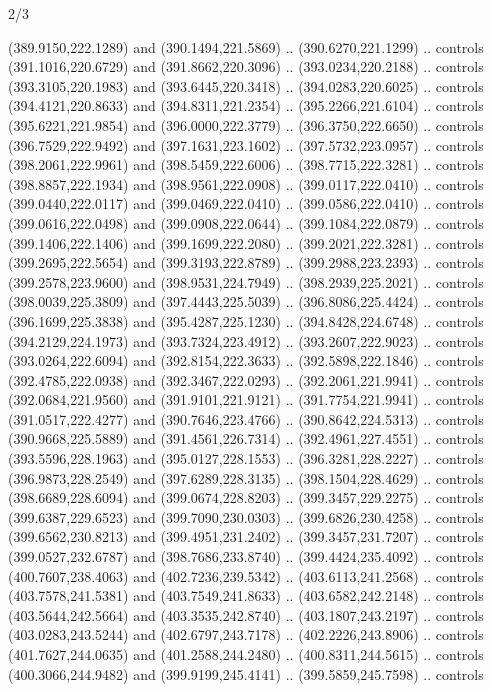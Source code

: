 \begin{flagdescription}{2/3}
\begin{scope}[xshift=0.5\flaglength,yshift=0.5\flagwidth,scale=\flagwidth/495.65]
\begin{scope}[y=0.8pt, x=0.8pt, yscale=-1,shift={(-463.76,-309.78)}]
  (389.9150,222.1289) and (390.1494,221.5869) .. (390.6270,221.1299) .. controls
  (391.1016,220.6729) and (391.8662,220.3096) .. (393.0234,220.2188) .. controls
  (393.3105,220.1983) and (393.6445,220.3418) .. (394.0283,220.6025) .. controls
  (394.4121,220.8633) and (394.8311,221.2354) .. (395.2266,221.6104) .. controls
  (395.6221,221.9854) and (396.0000,222.3779) .. (396.3750,222.6650) .. controls
  (396.7529,222.9492) and (397.1631,223.1602) .. (397.5732,223.0957) .. controls
  (398.2061,222.9961) and (398.5459,222.6006) .. (398.7715,222.3281) .. controls
  (398.8857,222.1934) and (398.9561,222.0908) .. (399.0117,222.0410) .. controls
  (399.0440,222.0117) and (399.0469,222.0410) .. (399.0586,222.0410) .. controls
  (399.0616,222.0498) and (399.0908,222.0644) .. (399.1084,222.0879) .. controls
  (399.1406,222.1406) and (399.1699,222.2080) .. (399.2021,222.3281) .. controls
  (399.2695,222.5654) and (399.3193,222.8789) .. (399.2988,223.2393) .. controls
  (399.2578,223.9600) and (398.9531,224.7949) .. (398.2939,225.2021) .. controls
  (398.0039,225.3809) and (397.4443,225.5039) .. (396.8086,225.4424) .. controls
  (396.1699,225.3838) and (395.4287,225.1230) .. (394.8428,224.6748) .. controls
  (394.2129,224.1973) and (393.7324,223.4912) .. (393.2607,222.9023) .. controls
  (393.0264,222.6094) and (392.8154,222.3633) .. (392.5898,222.1846) .. controls
  (392.4785,222.0938) and (392.3467,222.0293) .. (392.2061,221.9941) .. controls
  (392.0684,221.9560) and (391.9101,221.9121) .. (391.7754,221.9941) .. controls
  (391.0517,222.4277) and (390.7646,223.4766) .. (390.8642,224.5313) .. controls
  (390.9668,225.5889) and (391.4561,226.7314) .. (392.4961,227.4551) .. controls
  (393.5596,228.1963) and (395.0127,228.1553) .. (396.3281,228.2227) .. controls
  (396.9873,228.2549) and (397.6289,228.3135) .. (398.1504,228.4629) .. controls
  (398.6689,228.6094) and (399.0674,228.8203) .. (399.3457,229.2275) .. controls
  (399.6387,229.6523) and (399.7090,230.0303) .. (399.6826,230.4258) .. controls
  (399.6562,230.8213) and (399.4951,231.2402) .. (399.3457,231.7207) .. controls
  (399.0527,232.6787) and (398.7686,233.8740) .. (399.4424,235.4092) .. controls
  (400.7607,238.4063) and (402.7236,239.5342) .. (403.6113,241.2568) .. controls
  (403.7578,241.5381) and (403.7549,241.8633) .. (403.6582,242.2148) .. controls
  (403.5644,242.5664) and (403.3535,242.8740) .. (403.1807,243.2197) .. controls
  (403.0283,243.5244) and (402.6797,243.7178) .. (402.2226,243.8906) .. controls
  (401.7627,244.0635) and (401.2588,244.2480) .. (400.8311,244.5615) .. controls
  (400.3066,244.9482) and (399.9199,245.4141) .. (399.5859,245.7598) .. controls

\end{scope}
\end{scope}
\end{flagdescription}
